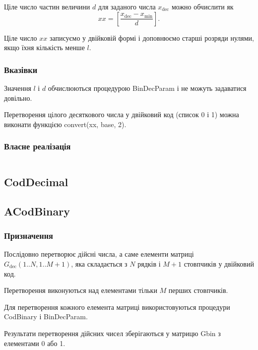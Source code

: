 \documentclass[a4paper, 12pt]{article}
\numberwithin{equation}{section}
\begin{document}
Ціле число частин величини $d$ для заданого числа $x_{\text{dec}}$ можно обчислити як
\begin{equation}
    xx = \left[ \frac{x_{\text{dec}} - x_{\text{min}}}{d} \right].
\end{equation}

Ціле число $xx$ записуємо у двійковій формі і доповнюємо старші розряди нулями, якщо їхня кількість менше $l$.

\subsubsection{Вказівки}

Значення $l$ і $d$ обчислюються процедурою BinDecParam і не можуть задаватися довільно. \medskip

Перетворення цілого десяткового числа у двійковий код (список 0 і 1) можна виконати функцією convert(xx, base, 2).

\subsubsection{Власне реалізація}

\inputminted[firstline=7, lastline=28]{python}{../code/cod_binary.py}

\subsection{CodDecimal}

\subsection{ACodBinary}

\subsubsection{Призначення}

Послідовно перетворює дійсні числа, а саме елементи матриці $G_{\text{dec}}(1..N,1..M+1)$, яка складається з $N$ рядків і $M + 1$ стовпчиків у двійковий код. \medskip

Перетворення виконуються над елементами тільки $M$ перших стовпчиків. \medskip

Для перетворення кожного елемента матриці використовуються процедури CodBinary і BinDecParam. \medskip

Результати перетворення дійсних чисел зберігаються у матрицю Gbin з елементами 0 або 1. \medskip
\end{document}

